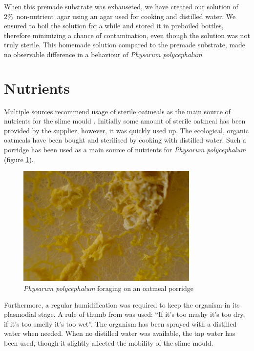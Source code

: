 \documentclass[english,a4paper,twoside]{ppfcmthesis}
\begin{document}
When this premade substrate was exhauseted, we have created our solution of 2\%~non-nutrient~agar using an agar used for cooking and distilled water. We ensured to boil the solution for a while and stored it in preboiled bottles, therefore minimizing a chance of contamination, even though the solution was not truly sterile. This homemade solution compared to the premade substrate, made no observable difference in a behaviour of \textit{Physarum polycephalum}.


\section*{Nutrients}

Multiple sources recommend usage of sterile oatmeals as the main source of nutrients for the slime mould \cite{nakagaki2000intelligence,nakagaki2004obtaining,adamatzky2010physarum}. Initially some amount of sterile oatmeal has been provided by the supplier, however, it was quickly used up. The ecological, organic oatmeals have been bought and sterilised by cooking with distilled water. Such a porridge has been used as a main source of nutrients for \textit{Physarum polycephalum} (figure \ref{figure:p_porridge}).

\begin{figure}
  \centering

  \includegraphics[width=0.8\textwidth]{figures/physarum/D8E_2184.jpg}

  \caption{\textit{Physarum polycephalum} foraging on an oatmeal porridge}
  \label{figure:p_porridge}
\end{figure}

Furthermore, a regular humidification was required to keep the organism in its plasmodial stage. A rule of thumb from \cite{adamatzky2010physarum} was used: ``If it's too mushy it's too dry, if it's too smelly it's too wet''. The organism has been sprayed with a distilled water when needed. When no distilled water was available, the tap water has been used, though it slightly affected the mobility of the slime mould.
\end{document}
